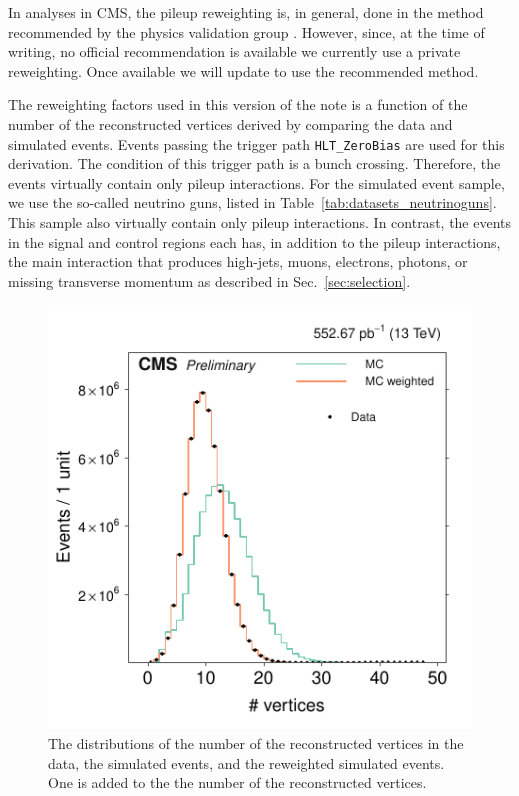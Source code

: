 In analyses in CMS, the pileup reweighting is, in general, done in the
method recommended by the physics validation group
\cite{twiki-PdmVPileUpDescription}. However, since, at the time of
writing, no official recommendation is available we currently use a private reweighting.
Once available we will update to use the recommended method.

The reweighting factors used in this version of the note is a function
of the number of the reconstructed vertices derived by comparing the
data and simulated events. Events passing the trigger path
\verb!HLT_ZeroBias! are used for this derivation. The condition of this
trigger path is a bunch crossing. Therefore, the events virtually
contain only pileup interactions. For the simulated event sample, we use
the so-called neutrino guns, listed in
Table~\ref{tab:datasets_neutrinoguns}. This sample also virtually
contain only pileup interactions. In contrast, the events in the signal
and control regions each has, in addition to the pileup interactions, the
main interaction that produces high-\PT jets, muons, electrons, photons,
or missing transverse momentum as described in
Sec.~\ref{sec:selection}.


\begin{table}[!h]
\footnotesize 
\label{tab:datasets_neutrinoguns}
\end{table}

\begin{figure}[!b]
\centering
\includegraphics[scale=1.00]{figures/pileup_reweighting/f042_corr_nVert_data_mc_norm}
\caption{The distributions of the number of the reconstructed vertices
in the data, the simulated events, and the reweighted simulated events.
One is added to the the number of the reconstructed vertices.}
\label{f042_corr_nVert_data_mc_norm}
\end{figure}

